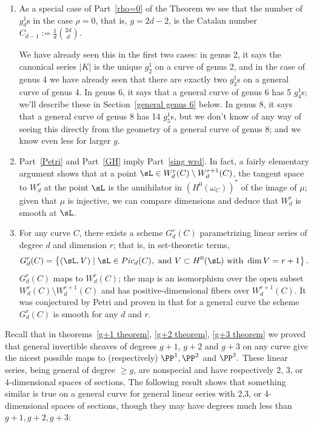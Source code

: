 \begin{remark}

\begin{enumerate}
 \item As a special case of Part~\ref{rho=0} of the Theorem we see that the number of $g^{1}_{d}$s
 in the case $\rho=0$, that is, $g=2d-2$, is the Catalan number $C_{d-1}:= \frac{1}{d}\binom{2d}{d}$.

We have already seen this in the first two cases: in genus 2, it says the canonical series $|K|$ is the unique $g^1_2$ on a curve of genus 2, and in the case of genus 4 we have already seen  that there are exactly two $g^1_3$s on a general curve of genus 4. In genus 6, it says that a general curve of genus 6 has 5 $g^1_4$s; we'll describe these in Section~\ref{general genus 6} below.  In genus 8, it says that a general curve of genus 8 has 14 $g^1_5$s, but we don't know of any way of seeing this directly from the geometry of a general curve of genus 8; and we know even less for larger $g$.

\item Part~\ref{Petri} and Part~\ref{GH} imply Part~\ref{sing wrd}. In fact, a fairly elementary argument  shows that at a point $\sL  \in W^r_d(C) \setminus W^{r+1}_d(C)$, the tangent space to $W^r_d$ at the point $\sL $ is the annihilator
in $(H^0(\omega_C))^*$ of the image of $\mu$; given that $\mu$ is injective, we can compare dimensions and deduce that $W^r_d$ is smooth at $\sL $.

\item For any curve $C$, there exists a scheme $G^r_d(C)$ parametrizing linear series of degree $d$ and dimension $r$; that is, in set-theoretic terms,
$$
G^r_d(C) = \left\{ (\sL , V) \mid \sL  \in Pic_d(C), \text{ and } V \subset H^0(\sL ) \text{ with } \dim V = r+1 \right\}.
$$
$G^r_d(C)$ maps to $W^r_d(C)$; the map is an isomorphism over the open subset $W^r_d(C) \setminus W^{r+1}_d(C)$ and has positive-dimensional fibers over $W^{r+1}_d(C)$. It was conjectured
by Petri and proven in \cite{Gieseker-Petri} that for a general curve the scheme $G^r_d(C)$ is smooth for any $d$ and $r$.
\end{enumerate}
\end{remark}


Recall that  in theorems~\ref{g+1 theorem}, \ref{g+2 theorem}, \ref{g+3 theorem} we proved that
general invertible sheaves of degrees $g+1$, $g+2$ and $g+3$ on any curve
give the nicest possible maps to (respectively) $\PP^1, \PP^2$ and $\PP^3.$ These
linear series, being general of degree $\geq g$, are  nonspecial and have respectively
2, 3, or 4-dimensional spaces of sections. The following result shows that something
similar is true on a general curve for general linear series with 2,3, or 4-dimensional
spaces of sections, though they may have degrees much less than $g+1, g+2, g+3$:

